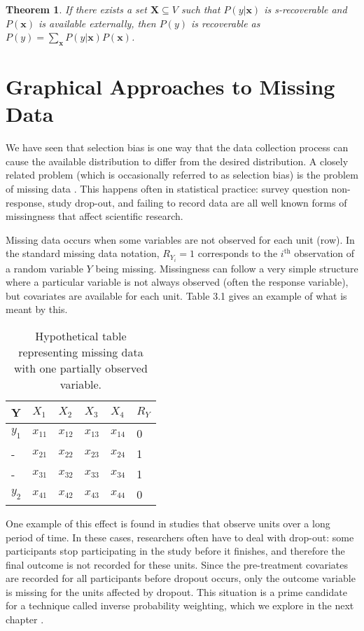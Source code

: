\documentclass[12pt,twoside]{reedthesis}
\newtheorem{theorem}{Theorem}
\theoremstyle{definition}
\begin{document}
\begin{theorem}
If there exists a set $\mathbf{X} \subseteq V$ such that $P(y|\mathbf{x})$ is s-recoverable and $P(\mathbf{x})$ is available externally, then $P(y)$ is recoverable as $P(y) = \sum_{\mathbf{x}} P(y|\mathbf{x})P(\mathbf{x})$.
\end{theorem}

\chapter{Graphical Approaches to Missing Data}

We have seen that selection bias is one way that the data collection process can cause the available distribution to differ from the desired distribution. A closely related problem (which is occasionally referred to as selection bias) is the problem of missing data \citep{Heckman_1979}. This happens often in statistical practice: survey question non-response, study drop-out, and failing to record data are all well known forms of missingness that affect scientific research. 

Missing data occurs when some variables are not observed for each unit (row). In the standard missing data notation, $R_{Y_i}=1$ corresponds to the $i^{\text{th}}$ observation of a random variable $Y$ being missing. Missingness can follow a very simple structure where a particular variable is not always observed (often the response variable), but covariates are available for each unit. Table 3.1 gives an example of what is meant by this. 


\begin{table}[]
\centering
\begin{tabular}{|l|l|l|l|l|l|}
Y     & $X_1$  & $X_2$  & $X_3$  & $X_4$  & $R_Y$ \\ \hline
$y_1$ & $x_{11}$ & $x_{12}$ & $x_{13}$ & $x_{14}$ & 0 \\
   -   & $x_{21}$ & $x_{22}$ & $x_{23}$ & $x_{24}$ & 1 \\
   -   & $x_{31}$ & $x_{32}$ & $x_{33}$ & $x_{34}$ & 1 \\
$y_2$ & $x_{41}$ & $x_{42}$ & $x_{43}$ & $x_{44}$ & 0
\end{tabular}
\caption{Hypothetical table representing missing data with one partially observed variable.} 
\end{table}

One example of this effect is found in studies that observe units over a long period of time. In these cases, researchers often have to deal with drop-out: some participants stop participating in the study before it finishes, and therefore the final outcome is not recorded for these units. Since the pre-treatment covariates are recorded for all participants before dropout occurs, only the outcome variable is missing for the units affected by dropout. This situation is a prime candidate for a technique called inverse probability weighting, which we explore in the next chapter \citep{Hernan_2004}.
\end{document}
